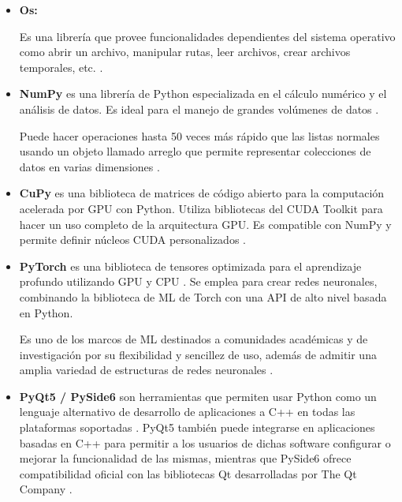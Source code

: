 \begin{itemize}
	
	\item \textbf{Os:}
	
	Es una librería que provee funcionalidades dependientes del sistema operativo como abrir un archivo, manipular rutas, leer archivos, crear archivos temporales, etc. \cite{pythonOS}.
	
	
	
	\item\textbf{NumPy} es una librería de Python especializada en el cálculo numérico y el análisis de datos. Es ideal para el manejo de grandes volúmenes de datos \cite{alfaro_numpy}.
	
	
	
	Puede hacer operaciones hasta 50 veces más rápido que las listas normales usando un objeto llamado arreglo que permite representar colecciones de datos en varias dimensiones \cite{alfaro_numpy}.
	
	
	
	\item \textbf{CuPy} es una biblioteca de matrices de código abierto para la computación acelerada por GPU con Python. Utiliza bibliotecas del CUDA Toolkit para hacer un uso completo de la arquitectura GPU. Es compatible con NumPy y permite definir núcleos CUDA personalizados \cite{cupy}. 
	
	
	
	\item\textbf{PyTorch} es una biblioteca de tensores optimizada para el aprendizaje profundo utilizando GPU y CPU \cite{pytorch_1}. Se emplea para crear redes neuronales, combinando la biblioteca de ML de Torch con una API de alto nivel basada en Python. 
	
	
	
	Es uno de los marcos de ML destinados a comunidades académicas y de investigación por su flexibilidad y sencillez de uso, además de admitir una amplia variedad de estructuras de redes neuronales \cite{pytorch_2}.
	
	
	
	\item \textbf{PyQt5 / PySide6} son herramientas que permiten usar Python como un lenguaje alternativo de desarrollo de aplicaciones a C++ en todas las plataformas soportadas \cite{qt_1}. PyQt5 también puede integrarse en aplicaciones basadas en C++ para permitir a los usuarios de dichas software configurar o mejorar la funcionalidad de las mismas, mientras que PySide6 ofrece compatibilidad oficial con las bibliotecas Qt desarrolladas por The Qt Company \cite{qt_2}.
	

\end{itemize}
